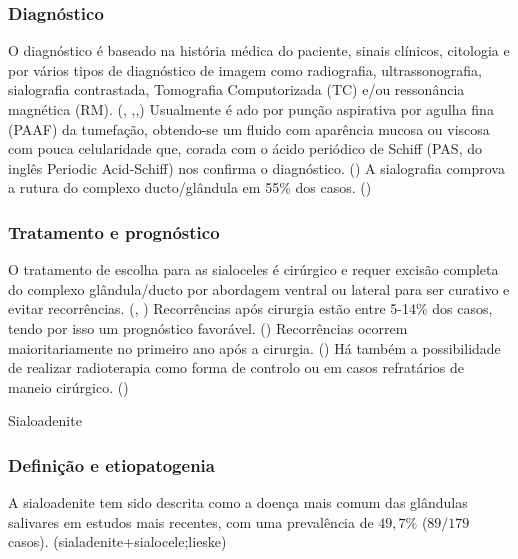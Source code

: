 \subsubsection{Diagnóstico}

O diagnóstico é baseado na história médica do paciente, sinais clínicos, citologia e por vários tipos de diagnóstico de imagem como radiografia, ultrassonografia, sialografia contrastada, Tomografia Computorizada (TC) e/ou ressonância magnética (RM). (\cite{animals}, \cite{sa_},\cite{Olimpo2023},\cite{de2020}) Usualmente é \cite{Kumar2017}ado por punção aspirativa por agulha fina (PAAF) da tumefação, obtendo-se um fluido com aparência mucosa ou viscosa com pouca celularidade que, corada com o ácido periódico de Schiff (PAS, do inglês Periodic Acid-Schiff) nos confirma o diagnóstico. (\cite{Poirier2018}) A sialografia comprova  a rutura do complexo ducto/glândula em 55\% dos casos. (\cite{Olimpo2023}) 

\subsubsection{Tratamento e prognóstico}

O tratamento de escolha para as sialoceles é cirúrgico e requer excisão completa do complexo glândula/ducto por abordagem ventral ou lateral para ser curativo e evitar recorrências. (\cite{Poirier2018}, \cite{Swieton2022}) Recorrências após cirurgia estão entre 5-14\% dos casos, tendo por isso um prognóstico favorável. (\cite{Poirier2018}) Recorrências ocorrem maioritariamente no primeiro ano após a cirurgia. (\cite{Swieton2022}) Há também a possibilidade de realizar radioterapia como forma de controlo ou em casos refratários de maneio cirúrgico. (\cite{Poirier2018})

Sialoadenite
\subsubsection{Definição e etiopatogenia}
A sialoadenite tem sido descrita como a doença mais comum das glândulas salivares em estudos mais recentes, com uma prevalência de $49,7\%$  ($89/179$ casos). (sialadenite+sialocele;lieske)

